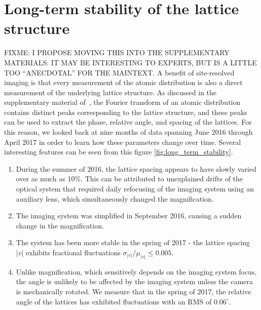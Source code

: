 \documentclass[twocolumn,aps,pra,showpacs,preprintnumbers,bibnotes]{revtex4-1}
\begin{document}
\section{Long-term stability of the lattice structure}
FIXME: I PROPOSE MOVING THIS INTO THE SUPPLEMENTARY MATERIALS: IT MAY BE INTERESTING TO EXPERTS, BUT IS A LITTLE TOO ``ANECDOTAL'' FOR THE MAINTEXT.
A benefit of site-resolved imaging is that every measurement of the atomic distribution is also a direct measurement of the underlying lattice structure. 
As discussed in the supplementary material of~\cite{Parsons2016, Greif2016}, the Fourier transform of an atomic distribution contains distinct peaks corresponding to the lattice structure, and these peaks can be used to extract the phase, relative angle, and spacing of the lattices.
For this reason, we looked back at nine months of data spanning June 2016 through April 2017 in order to learn how these parameters change over time.
Several interesting features can be seen from this figure \ref{fig:long_term_stability}.
\begin{enumerate}
  \item During the summer of 2016, the lattice spacing appears to have slowly varied over as much as 10\%.
    This can be attributed to unexplained drifts of the optical system that required daily refocusing of the imaging system using an auxiliary lens, which simultaneously changed the magnification. 
  \item The imaging system was simplified in September 2016, causing a sudden change in the magnification. 
  \item The system has been more stable in the spring of 2017 - the lattice spacing $|v|$ exhibits fractional fluctuations $\sigma_{|v|}/\mu_{|v|}\leq 0.005$.
  \item Unlike magnification, which sensitively depends on the imaging system focus, the angle is unlikely to be affected by the imaging system unless the camera is mechanically rotated. We measure that in the spring of 2017, the relative angle of the lattices has exhibited fluctuations with an RMS of $0.06^\circ$.
\end{enumerate}
\end{document}
